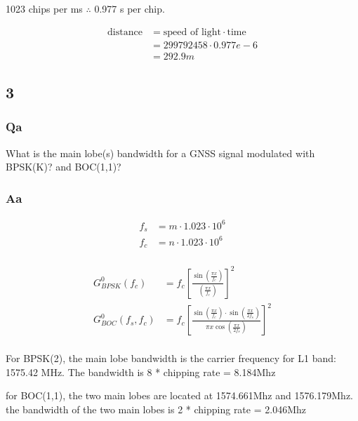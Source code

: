 \documentclass[11pt]{article}
\begin{document}
 1023 chips per ms $\therefore$ 0.977 \mu s per chip.

\begin{equation}
  \begin{split}
      \text{distance} &= \text{speed of light} \cdot \text{time}\\
        &= 299 792 458 \cdot 0.977e-6\\
        &= 292.9 m
  \end{split}
\end{equation}


\subsection{3}

\subsubsection{Qa}
What is the main lobe(s) bandwidth for a GNSS signal modulated with BPSK(K)? and BOC(1,1)?
\subsubsection{Aa}

\begin{equation}
    \begin{split}
        f_s & = m \cdot 1.023 \cdot 10^6\\
        f_c & = n \cdot 1.023 \cdot 10^6\\
    \end{split}
\end{equation}

\begin{equation}
    \begin{split}
        G^{0}_{BPSK}\left(f_c\right) &= f_{c}\left[\frac{\sin\left(\frac{\pi x}{f_{c}}\right)}{\left(\frac{\pi x}{f_{c}}\right)}\right]^{2}\\
        G^{0}_{BOC}\left(f_s,f_c\right) &= f_{c}\left[\frac{\sin\left(\frac{\pi x}{f_{c}}\right)\cdot\sin\left(\frac{\pi x}{2f_{s}}\right)}{\pi x\cos\left(\frac{\pi x}{2f_{s}}\right)}\right]^{2}\\
    \end{split}
\end{equation}


For BPSK(2), the main lobe bandwidth is the carrier frequency for L1 band: 1575.42 MHz. The bandwidth is 8 * chipping rate = 8.184Mhz

for BOC(1,1), the two main lobes are located at 1574.661Mhz and 1576.179Mhz. the bandwidth of the two main lobes is 2 * chipping rate = 2.046Mhz
\end{document}
